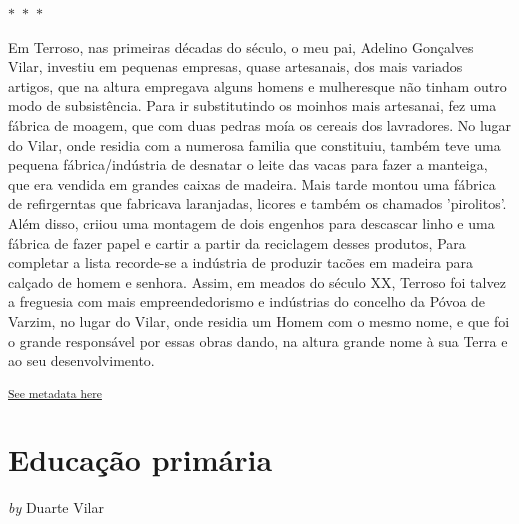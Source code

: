 \documentclass{article}
\begin{document}
    $\ast$~$\ast$~$\ast$  


    \begin{center}
        \begin{minipage}{0.9\textwidth}
            \setlength{\parskip}{0.2cm}
            \setlength{\parindent}{0cm}
            \fontsize{12pt}{14pt}\selectfont
            


Em Terroso, nas primeiras décadas do século, o meu pai, Adelino
Gonçalves Vilar, investiu em pequenas empresas, quase artesanais, dos
mais variados artigos, que na altura empregava alguns homens e
mulheresque não tinham outro modo de subsistência. Para ir substitutindo
os moinhos mais artesanai, fez uma fábrica de moagem, que com duas
pedras moía os cereais dos lavradores. No lugar do Vilar, onde residia
com a numerosa familia que constituiu, também teve uma pequena
fábrica/indústria de desnatar o leite das vacas para fazer a manteiga,
que era vendida em grandes caixas de madeira. Mais tarde montou uma
fábrica de refirgerntas que fabricava laranjadas, licores e também os
chamados 'pirolitos'. Além disso, criiou uma montagem de dois engenhos
para descascar linho e uma fábrica de fazer papel e cartir a partir da
reciclagem desses produtos, Para completar a lista recorde-se a
indústria de produzir tacões em madeira para calçado de homem e senhora.
Assim, em meados do século XX, Terroso foi talvez a freguesia com mais
empreendedorismo e indústrias do concelho da Póvoa de Varzim, no lugar
do Vilar, onde residia um Homem com o mesmo nome, e que foi o grande
responsável por essas obras dando, na altura grande nome à sua Terra e
ao seu desenvolvimento.

        \end{minipage}
    \end{center}

    
        \textsuperscript{\hyperref[table:\arabic{tablecounter}]{See metadata here}}
    


\newpage
\section{Educação primária}


    
        \textit{by} Duarte Vilar
    
\end{document}
